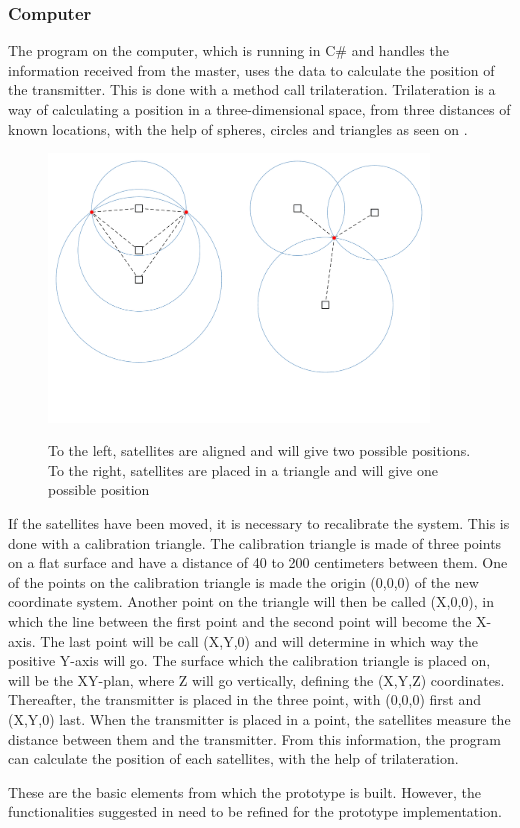 \subsubsection{Computer}
The program on the computer, which is running in C\# and handles the information received from the master, uses the data to calculate the position of the transmitter. This is done with a method call trilateration. Trilateration is a way of calculating a position in a three-dimensional space, from three distances of known locations, with the help of spheres, circles and triangles as seen on .
%
\begin{figure}[H]
  \centering
  {
    \includegraphics[width=0.9\textwidth]{figures/GoT_SingleVsTriangle.pdf}
  }
  \caption{To the left, satellites are aligned and will give two possible positions. To the right, satellites are placed in a triangle and will give one possible position}
  \label{GoTTriVSLine}
\end{figure}\vspace{-5mm}
%
If the satellites have been moved, it is necessary to recalibrate the system. This is done with a calibration triangle. The calibration triangle is made of three points on a flat surface and have a distance of 40 to 200 centimeters between them. One of the points on the calibration triangle is made the origin (0,0,0) of the new coordinate system. Another point on the triangle will then be called (X,0,0), in which the line between the first point and the second point will become the X-axis. The last point will be call (X,Y,0) and will determine in which way the positive Y-axis will go. The surface which the calibration triangle is placed on, will be the XY-plan, where Z will go vertically, defining the (X,Y,Z) coordinates. Thereafter, the transmitter is placed in the three point, with (0,0,0) first and (X,Y,0) last. When the transmitter is placed in a point, the satellites measure the distance between them and the transmitter. From this information, the program can calculate the position of each satellites, with the help of trilateration.

These are the basic elements from which the prototype is built. However, the functionalities suggested in  need to be refined for the prototype implementation.